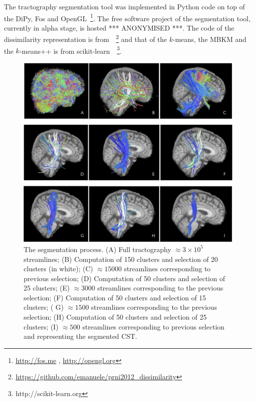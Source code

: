 The tractography segmentation tool was implemented in Python code on
top of the DiPy, Fos and OpenGL~\footnote{\url{http://fos.me} ,
  \url{http://opengl.org}}. The free software project of the
segmentation tool, currently in alpha stage, is hosted
*** ANONYMISED ***.
The code of the dissimilarity representation is
from~\cite{olivetti2012approximation}~\footnote{\url{https://github.com/emanuele/prni2012_dissimilarity}}
and that of the $k$-means, the MBKM and the $k$-means++ is from
scikit-learn~\cite{pedregosa2011scikit}~\footnote{http://scikit-learn.org}.

\begin{figure}[t]
\centering
\includegraphics[width=\textwidth]{figure}
\caption{The segmentation process. (A) Full tractography $\approx 3
  \times 10^5$ streamlines; (B) Computation of 150 clusters and
  selection of 20 clusters (in white); (C) $\approx15000$ streamlines
  corresponding to previous selection; (D) Computation of 50 clusters
  and selection of 25 clusters; (E) $\approx 3000$ streamlines
  corresponding to the previous selection; (F) Computation of 50
  clusters and selection of 15 clusters; ( G) $\approx 1500$
  streamlines corresponding to the previous selection; (H) Computation
  of 50 clusters and selection of 25 clusters; (I) $\approx 500$
  streamlines corresponding to previous selection and representing the
  segmented CST.}
\label{fig}
\end{figure}


